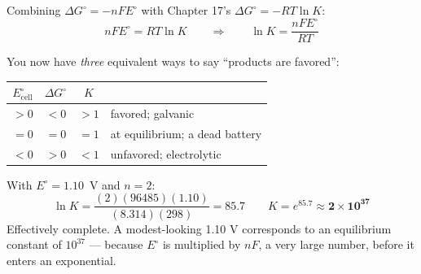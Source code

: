 \documentclass{apchem-notes}
\begin{document}


Combining $\Delta G^\circ = -nFE^\circ$ with Chapter 17's
$\Delta G^\circ = -RT\ln K$:
\[ nFE^\circ = RT\ln K \qquad\Longrightarrow\qquad
   \ln K = \frac{nFE^\circ}{RT} \]

You now have \emph{three} equivalent ways to say ``products are favored'':

\begin{center}
\begin{tabular}{@{}cccl@{}}
\hline
$E^\circ_{\text{cell}}$ & $\Delta G^\circ$ & $K$ & \\
\hline
$> 0$ & $< 0$ & $> 1$ & favored; galvanic \\
$= 0$ & $= 0$ & $= 1$ & at equilibrium; a dead battery \\
$< 0$ & $> 0$ & $< 1$ & unfavored; electrolytic \\
\hline
\end{tabular}
\end{center}

\begin{workedexample}
With $E^\circ = 1.10$~V and $n = 2$:
\[ \ln K = \frac{(2)(96485)(1.10)}{(8.314)(298)} = 85.7
   \qquad K = e^{85.7} \approx \mathbf{2\times10^{37}} \]
Effectively complete. A modest-looking 1.10 V corresponds to an equilibrium
constant of $10^{37}$ --- because $E^\circ$ is multiplied by $nF$, a very
large number, before it enters an exponential.
\end{workedexample}

\end{document}
